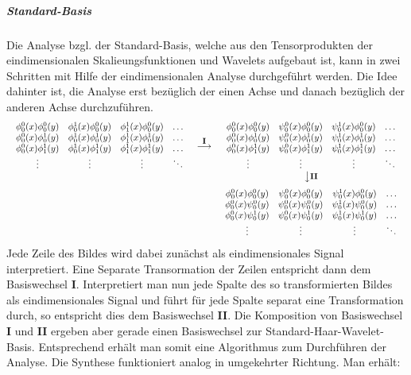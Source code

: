 \subparagraph{Standard-Basis} Die Analyse bzgl. der Standard-Basis, welche aus den Tensorprodukten der eindimensionalen Skalieungsfunktionen und Wavelets aufgebaut ist, kann in zwei Schritten mit Hilfe der eindimensionalen Analyse durchgeführt werden. Die Idee dahinter ist, die Analyse erst bezüglich der einen Achse und danach bezüglich der anderen Achse durchzuführen.
%
\[
\begin{array}{ccc}
{
\begin{array}{cccc}
\phi_0^0(x)\phi_0^0(y) & \phi_0^1(x)\phi_0^0(y) & \phi_1^1(x)\phi_0^0(y) & \hdots \\
\phi_0^0(x)\phi_0^1(y) & \phi_0^1(x)\phi_0^1(y) & \phi_1^1(x)\phi_0^1(y) & \hdots \\
\phi_0^0(x)\phi_1^1(y) & \phi_0^1(x)\phi_1^1(y) & \phi_1^1(x)\phi_1^1(y) & \hdots \\
\vdots & \vdots & \vdots & \ddots \\
\end{array}
} &
\overset{\mbox{\small \textbf{I}}}{\longrightarrow} &
{
\begin{array}{cccc}
\phi_0^0(x)\phi_0^0(y) & \psi_0^0(x)\phi_0^0(y) & \psi_0^1(x)\phi_0^0(y) & \hdots \\
\phi_0^0(x)\phi_0^1(y) & \psi_0^0(x)\phi_0^1(y) & \psi_0^1(x)\phi_0^1(y) & \hdots \\
\phi_0^0(x)\phi_1^1(y) & \psi_0^0(x)\phi_1^1(y) & \psi_0^1(x)\phi_1^1(y) & \hdots \\
\vdots & \vdots & \vdots & \ddots \\
\end{array}
} \\
 &
 &
\big\downarrow \mbox{\small \textbf{II}} \\[.25cm]
 &
 &
{
\begin{array}{cccc}
\phi_0^0(x)\phi_0^0(y) & \psi_0^0(x)\phi_0^0(y) & \psi_0^1(x)\phi_0^0(y) & \hdots \\
\phi_0^0(x)\psi_0^0(y) & \psi_0^0(x)\psi_0^0(y) & \psi_0^1(x)\psi_0^0(y) & \hdots \\
\phi_0^0(x)\psi_0^1(y) & \psi_0^0(x)\psi_0^1(y) & \psi_0^1(x)\psi_0^1(y) & \hdots \\
\vdots & \vdots & \vdots & \ddots \\
\end{array}
}
\end{array}
\]
%
Jede Zeile des Bildes wird dabei zunächst als eindimensionales Signal interpretiert. Eine Separate Transormation der Zeilen entspricht dann dem Basiswechsel \textbf{I}. Interpretiert man nun jede Spalte des so transformierten Bildes als eindimensionales Signal und führt für jede Spalte separat eine Transformation durch, so entspricht dies dem Basiswechsel \textbf{II}. Die Komposition von Basiswechsel \textbf{I} und \textbf{II} ergeben aber gerade einen Basiswechsel zur Standard-Haar-Wavelet-Basis. Entsprechend erhält man somit eine Algorithmus zum Durchführen der Analyse. Die Synthese funktioniert analog in umgekehrter Richtung. Man erhält:

